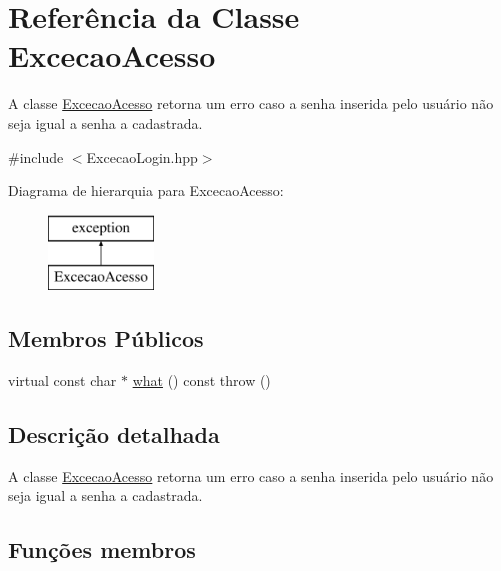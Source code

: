 \hypertarget{class_excecao_acesso}{}\section{Referência da Classe Excecao\+Acesso}
\label{class_excecao_acesso}


A classe \mbox{\hyperlink{class_excecao_acesso}{Excecao\+Acesso}} retorna um erro caso a senha inserida pelo usuário não seja igual a senha a cadastrada.  




{\ttfamily \#include $<$Excecao\+Login.\+hpp$>$}

Diagrama de hierarquia para Excecao\+Acesso\+:\begin{figure}[H]
\begin{center}
\leavevmode
\includegraphics[height=2.000000cm]{class_excecao_acesso}
\end{center}
\end{figure}
\subsection*{Membros Públicos}
\begin{DoxyCompactItemize}
\item 
virtual const char $\ast$ \mbox{\hyperlink{class_excecao_acesso_aad764484ce507ddf4e74f88a2b8bb08e}{what}} () const  throw ()
\end{DoxyCompactItemize}


\subsection{Descrição detalhada}
A classe \mbox{\hyperlink{class_excecao_acesso}{Excecao\+Acesso}} retorna um erro caso a senha inserida pelo usuário não seja igual a senha a cadastrada. 

\subsection{Funções membros}
\mbox{\label{class_excecao_acesso_aad764484ce507ddf4e74f88a2b8bb08e}} 
